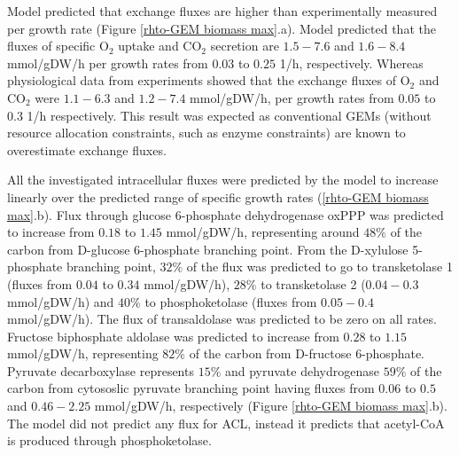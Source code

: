 Model predicted that exchange fluxes are higher than experimentally measured per growth rate (Figure \ref{rhto-GEM biomass max}.a). Model predicted that the fluxes of specific O$_2$ uptake and CO$_2$ secretion are $1.5-7.6$ and $1.6-8.4$ \unit{mmol/gDW/h} per growth rates from $0.03$ to $0.25$ \unit{1/h}, respectively. Whereas physiological data from experiments showed that the exchange fluxes of O$_2$ and CO$_2$ were $1.1-6.3$ and $1.2-7.4$ \unit{mmol/gDW/h}, per growth rates from $0.05$ to $0.3$ \unit{1/h} respectively. 
This result was expected as conventional GEMs (without resource allocation constraints, such as enzyme constraints) are known to overestimate exchange fluxes. 

All the investigated intracellular fluxes were predicted by the model to increase linearly over the predicted range of specific growth rates (\ref{rhto-GEM biomass max}.b). %
Flux through glucose 6-phosphate dehydrogenase oxPPP was predicted to increase from $0.18$ to $1.45$ \unit{mmol/gDW/h}, representing around $48\%$ of the carbon from 
D-glucose 6-phosphate branching point. From the D-xylulose 5-phosphate branching point, $32\%$ of the flux was 
predicted to go to transketolase 1 (fluxes from $0.04$ to $0.34$ \unit{mmol/gDW/h}), $28\%$ to 
transketolase 2 ($0.04-0.3$ \unit{mmol/gDW/h}) and $40\%$ to phosphoketolase (fluxes from $0.05-0.4$ \unit{mmol/gDW/h}). 
The flux of transaldolase was predicted to be zero on all rates. Fructose biphosphate aldolase was predicted to increase from 
$0.28$ to $1.15$ \unit{mmol/gDW/h}, representing $82\%$ of the carbon from D-fructose 6-phosphate. 
Pyruvate decarboxylase represents $15\%$ and pyruvate dehydrogenase $59\%$ of the carbon from %
cytososlic pyruvate branching point having fluxes from $0.06$ to $0.5$ and $0.46-2.25$ \unit{mmol/gDW/h}, respectively (Figure \ref{rhto-GEM biomass max}.b).
The model did not predict any flux for ACL, instead it predicts that acetyl-CoA is produced through phosphoketolase. %
